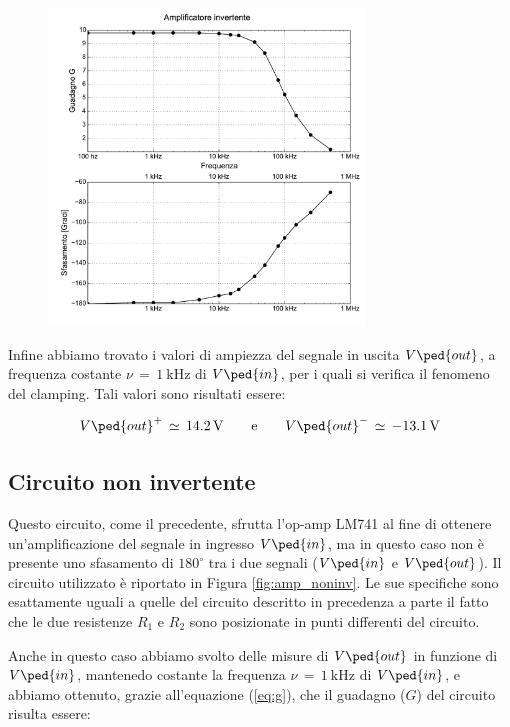 \begin{figure}
    \includegraphics[width=0.75\textwidth]{amp_inv.pdf}
    \caption{}
    \label{fig:g_vs_freq}
\end{figure}

Infine abbiamo trovato i valori di ampiezza del segnale in uscita $V\ped{out}$, a frequenza costante $\nu\,=\,\SI{1}{\kilo\hertz}$ di $V\ped{in}$, per i quali si verifica il fenomeno del clamping. Tali valori sono risultati essere:

\begin{equation}
        V\ped{out}^{+}\,\simeq\,\SI{14.2}{\volt} \qquad \text{e} \qquad V\ped{out}^{-}\,\simeq\,\SI{-13.1}{\volt}
\end{equation}

\subsection*{Circuito non invertente}

Questo circuito, come il precedente, sfrutta l'op-amp LM741 al fine di ottenere un'amplificazione del segnale in ingresso $V\ped{in}$, ma in questo caso non è presente uno sfasamento di $180^\circ$ tra i due segnali ($V\ped{in}$ e $V\ped{out}$).
Il circuito utilizzato è riportato in Figura \ref{fig:amp_noninv}. Le sue specifiche sono esattamente uguali a quelle del circuito descritto in precedenza a parte il fatto che le due resistenze $R_1$ e $R_2$ sono posizionate in punti differenti del circuito.

Anche in questo caso abbiamo svolto delle misure di $V\ped{out}$ in funzione di $V\ped{in}$, mantenedo costante la frequenza $\nu\,=\,\SI{1}{\kilo\hertz}$ di $V\ped{in}$, e abbiamo ottenuto, grazie all'equazione (\ref{eq:g}), che il guadagno ($G$) del circuito risulta essere:


